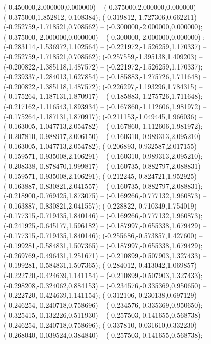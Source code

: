  (-0.450000,2.000000,0.000000) -- (-0.375000,2.000000,0.000000) -- (-0.375000,1.852812,-0.108384);
 (-0.319812,-1.727306,0.662211) -- (-0.252759,-1.718521,0.708562) -- (-0.300000,-2.000000,0.000000);
 (-0.375000,-2.000000,0.000000) -- (-0.300000,-2.000000,0.000000) ;
 (-0.283114,-1.536972,1.102564) -- (-0.221972,-1.526259,1.170337) -- (-0.252759,-1.718521,0.708562);
 (-0.257559,-1.395138,1.409203) -- (-0.200822,-1.385118,1.487572) -- (-0.221972,-1.526259,1.170337);
 (-0.239337,-1.284013,1.627854) -- (-0.185883,-1.275726,1.711648) -- (-0.200822,-1.385118,1.487572);
 (-0.226297,-1.193296,1.784315) -- (-0.175264,-1.187131,1.870917) -- (-0.185883,-1.275726,1.711648);
 (-0.217162,-1.116543,1.893934) -- (-0.167860,-1.112606,1.981972) -- (-0.175264,-1.187131,1.870917);
 (-0.211153,-1.049445,1.966036) -- (-0.163005,-1.047713,2.054782) -- (-0.167860,-1.112606,1.981972);
 (-0.207810,-0.988917,2.006150) -- (-0.160310,-0.989313,2.095210) -- (-0.163005,-1.047713,2.054782);
 (-0.206893,-0.932587,2.017155) -- (-0.159571,-0.935008,2.106291) -- (-0.160310,-0.989313,2.095210);
 (-0.208338,-0.878470,1.999817) -- (-0.160735,-0.882797,2.088831) -- (-0.159571,-0.935008,2.106291);
 (-0.212245,-0.824721,1.952925) -- (-0.163887,-0.830821,2.041557) -- (-0.160735,-0.882797,2.088831);
 (-0.218900,-0.769425,1.873075) -- (-0.169266,-0.777132,1.960873) -- (-0.163887,-0.830821,2.041557);
 (-0.228822,-0.710349,1.754019) -- (-0.177315,-0.719435,1.840146) -- (-0.169266,-0.777132,1.960873);
 (-0.241925,-0.645177,1.596182) -- (-0.187997,-0.655338,1.679429) -- (-0.177315,-0.719435,1.840146);
 (-0.255686,-0.573857,1.427600) -- (-0.199281,-0.584831,1.507365) -- (-0.187997,-0.655338,1.679429);
 (-0.269769,-0.496431,1.251671) -- (-0.210899,-0.507903,1.327433) -- (-0.199281,-0.584831,1.507365);
 (-0.284012,-0.413042,1.069857) -- (-0.222720,-0.424639,1.141154) -- (-0.210899,-0.507903,1.327433);
 (-0.298208,-0.324062,0.884153) -- (-0.234576,-0.335369,0.950650) -- (-0.222720,-0.424639,1.141154);
 (-0.312106,-0.230138,0.697129) -- (-0.246254,-0.240718,0.758696) -- (-0.234576,-0.335369,0.950650);
 (-0.325415,-0.132226,0.511930) -- (-0.257503,-0.141655,0.568738) -- (-0.246254,-0.240718,0.758696);
 (-0.337810,-0.031610,0.332230) -- (-0.268040,-0.039524,0.384840) -- (-0.257503,-0.141655,0.568738);
